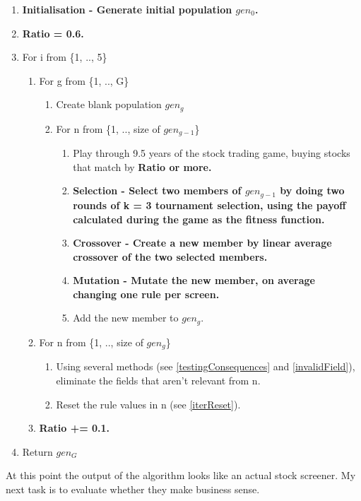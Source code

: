\begin{enumerate}
    \item \bf Initialisation \rm - Generate initial population $gen_{0}$.
    \item \bf Ratio \rm = 0.6.
    \item For i from \{1, .., 5\}
    \begin{enumerate}
        \item For g from \{1, .., G\}
        \begin{enumerate}
            \item Create blank population $gen_{g}$
            \item For n from \{1, .., size of $gen_{g-1}$\}
            \begin{enumerate}
                \item Play through 9.5 years of the stock trading game, buying stocks that match by \bf Ratio \rm or more.
                \item \bf Selection \rm - Select two members of $gen_{g-1}$ by doing two rounds of k = 3 tournament selection, using the payoff calculated during the game as the fitness function.
                \item \bf Crossover \rm - Create a new member by linear average crossover of the two selected members.
                \item \bf Mutation \rm - Mutate the new member, on average changing one rule per screen.
                \item Add the new member to $gen_{g}$.
            \end{enumerate}
        \end{enumerate}
        \item For n from \{1, .., size of $gen_{g}$\}
        \begin{enumerate}
            \item Using several methods (see \ref{testingConsequences} and \ref{invalidField}), eliminate the fields that aren't relevant from n.
            \item Reset the rule values in n (see \ref{iterReset}).
        \end{enumerate}
        \item \bf Ratio \rm += 0.1.
    \end{enumerate}
    \item Return $gen_{G}$
\end{enumerate}

At this point the output of the algorithm looks like an actual stock screener. My next task is to evaluate whether they make business sense.